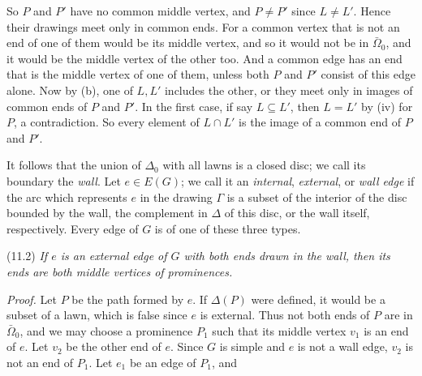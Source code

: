 {So $P$ and $P'$ have no common middle vertex, and $P \ne P'$ since $L \ne L'$. Hence their drawings
meet only in common ends. For a common vertex that is not an end of one of them would be its middle
vertex, and so it would not be in $\bar{\Omega}_0$, and it would be the middle vertex of the other
too. And a common edge has an end that is the middle vertex of one of them, unless both $P$ and $P'$
consist of this edge alone. Now by (b), one of $L, L'$ includes the other, or they meet only in
images of common ends of $P$ and $P'$. In the first case, if say $L \subseteq L'$, then $L = L'$ by
(iv) for $P$, a contradiction. So every element of $L \cap L'$ is the image of a common end of $P$
and $P'$.}

It follows that the union of $\Delta_0$ with all lawns is a closed disc; we call its boundary the \textit{wall}. Let $e \in E(G)$; we call it an \textit{internal}, \textit{external}, or \textit{wall edge} if the arc which represents $e$ in the drawing $\Gamma$ is a subset of the interior of the disc bounded by the wall, the complement in $\Delta$ of this disc, or the wall itself, respectively. Every edge of $G$ is of one of these three types.

\stmt
(11.2) \textit{If $e$ is an external edge of $G$ with both ends drawn in the wall, then its ends are both middle vertices of prominences.}

\textit{Proof.} Let $P$ be the path formed by $e$. If $\Delta(P)$ were defined, it would be a subset of a lawn, which is false since $e$ is external. Thus not both ends of $P$ are in $\bar{\Omega}_0$, and we may choose a prominence $P_1$ such that its middle vertex $v_1$ is an end of $e$. Let $v_2$ be the other end of $e$. Since $G$ is simple and $e$ is not a wall edge, $v_2$ is not an end of $P_1$. Let $e_1$ be an edge of $P_1$, and
